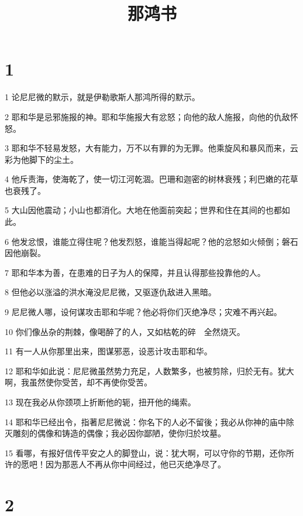 

\title{那鸿书}


\chapter{1}

\par 1 论尼尼微的默示，就是伊勒歌斯人那鸿所得的默示。
\par 2 耶和华是忌邪施报的神。耶和华施报大有忿怒；向他的敌人施报，向他的仇敌怀怒。
\par 3 耶和华不轻易发怒，大有能力，万不以有罪的为无罪。他乘旋风和暴风而来，云彩为他脚下的尘土。
\par 4 他斥责海，使海乾了，使一切江河乾涸。巴珊和迦密的树林衰残；利巴嫩的花草也衰残了。
\par 5 大山因他震动；小山也都消化。大地在他面前突起；世界和住在其间的也都如此。
\par 6 他发忿恨，谁能立得住呢？他发烈怒，谁能当得起呢？他的忿怒如火倾倒；磐石因他崩裂。
\par 7 耶和华本为善，在患难的日子为人的保障，并且认得那些投靠他的人。
\par 8 但他必以涨溢的洪水淹没尼尼微，又驱逐仇敌进入黑暗。
\par 9 尼尼微人哪，设何谋攻击耶和华呢？他必将你们灭绝净尽；灾难不再兴起。
\par 10 你们像丛杂的荆棘，像喝醉了的人，又如枯乾的碎　全然烧灭。
\par 11 有一人从你那里出来，图谋邪恶，设恶计攻击耶和华。
\par 12 耶和华如此说：尼尼微虽然势力充足，人数繁多，也被剪除，归於无有。犹大啊，我虽然使你受苦，却不再使你受苦。
\par 13 现在我必从你颈项上折断他的轭，扭开他的绳索。
\par 14 耶和华已经出令，指著尼尼微说：你名下的人必不留後；我必从你神的庙中除灭雕刻的偶像和铸造的偶像；我必因你鄙陋，使你归於坟墓。
\par 15 看哪，有报好信传平安之人的脚登山，说：犹大啊，可以守你的节期，还你所许的愿吧！因为那恶人不再从你中间经过，他已灭绝净尽了。

\chapter{2}

